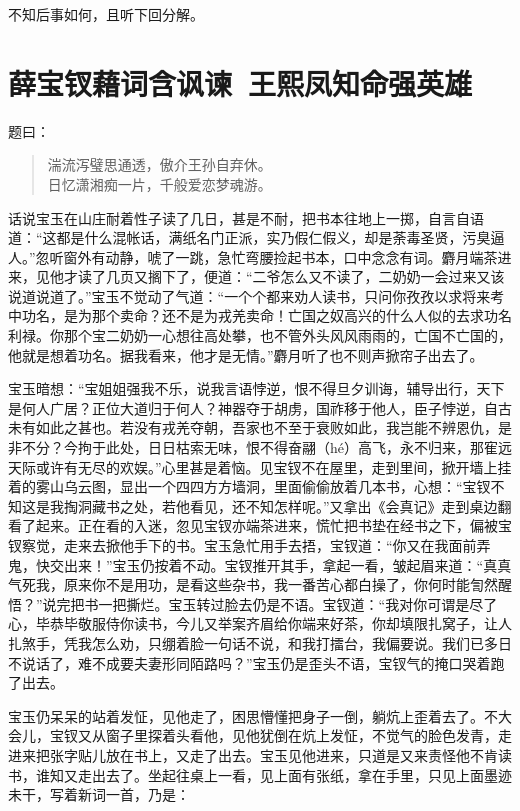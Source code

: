 \documentclass[12pt,oneside]{book}
\newenvironment{shici}{%
\begin{verse}%
\centering\large\hspace{12pt}}%
{\end{verse}}
\begin{document}
不知后事如何，且听下回分解。
 
\chapter{薛宝钗藉词含讽谏~王熙凤知命强英雄}
题曰：

\begin{shici}
湍流泻璧思通透，傲介王孙自弃休。\\
日忆潇湘痴一片，千般爱恋梦魂游。
\end{shici}

话说宝玉在山庄耐着性子读了几日，甚是不耐，把书本往地上一掷，自言自语道：“这都是什么混帐话，满纸名门正派，实乃假仁假义，却是荼毒圣贤，污臭逼人。”忽听窗外有动静，唬了一跳，急忙弯腰捡起书本，口中念念有词。麝月端茶进来，见他才读了几页又搁下了，便道：“二爷怎么又不读了，二奶奶一会过来又该说道说道了。”宝玉不觉动了气道：“一个个都来劝人读书，只问你孜孜以求将来考中功名，是为那个卖命？还不是为戎羌卖命！亡国之奴高兴的什么人似的去求功名利禄。你那个宝二奶奶一心想往高处攀，也不管外头风风雨雨的，亡国不亡国的，他就是想着功名。据我看来，他才是无情。”麝月听了也不则声掀帘子出去了。

宝玉暗想：“宝姐姐强我不乐，说我言语悖逆，恨不得旦夕训诲，辅导出行，天下是何人广居？正位大道归于何人？神器夺于胡虏，国祚移于他人，臣子悖逆，自古未有如此之甚也。若没有戎羌夺朝，吾家也不至于衰败如此，我岂能不辨恩仇，是非不分？今拘于此处，日日枯索无味，恨不得奋翮（hé）高飞，永不归来，那寉远天际或许有无尽的欢娱。”心里甚是着恼。见宝钗不在屋里，走到里间，掀开墙上挂着的雾山乌云图，显出一个四四方方墙洞，里面偷偷放着几本书，心想：“宝钗不知这是我掏洞藏书之处，若他看见，还不知怎样呢。”又拿出《会真记》走到桌边翻看了起来。正在看的入迷，忽见宝钗亦端茶进来，慌忙把书垫在经书之下，偏被宝钗察觉，走来去掀他手下的书。宝玉急忙用手去捂，宝钗道：“你又在我面前弄鬼，快交出来！”宝玉仍按着不动。宝钗推开其手，拿起一看，皱起眉来道：“真真气死我，原来你不是用功，是看这些杂书，我一番苦心都白操了，你何时能訇然醒悟？”说完把书一把撕烂。宝玉转过脸去仍是不语。宝钗道：“我对你可谓是尽了心，毕恭毕敬服侍你读书，今儿又举案齐眉给你端来好茶，你却填限扎窝子，让人扎煞手，凭我怎么劝，只绷着脸一句话不说，和我打擂台，我偏要说。我们已多日不说话了，难不成要夫妻形同陌路吗？”宝玉仍是歪头不语，宝钗气的掩口哭着跑了出去。

宝玉仍呆呆的站着发怔，见他走了，困思懵懂把身子一倒，躺炕上歪着去了。不大会儿，宝钗又从窗子里探着头看他，见他犹倒在炕上发怔，不觉气的脸色发青，走进来把张字贴儿放在书上，又走了出去。宝玉见他进来，只道是又来责怪他不肯读书，谁知又走出去了。坐起往桌上一看，见上面有张纸，拿在手里，只见上面墨迹未干，写着新词一首，乃是：
\end{document}
